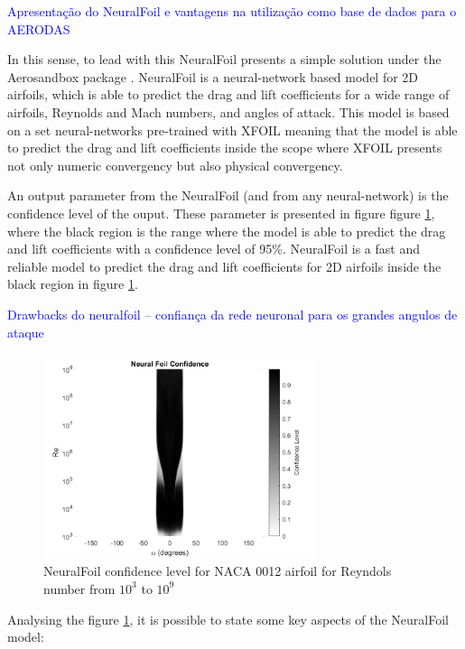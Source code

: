 \textcolor{blue}{Apresentação do NeuralFoil e vantagens na utilização como base de dados para o AERODAS} 

In this sense, to lead with this NeuralFoil \cite{sharpe_neuralfoil_nodate} presents a simple solution under the Aerosandbox package \cite{sharpe_aerosandbox_nodate,sharpe_accelerating_nodate}. NeuralFoil is a neural-network based model for 2D airfoils, which is able to predict the drag and lift coefficients for a wide range of airfoils, Reynolds and Mach numbers, and angles of attack. This model is based on a set neural-networks pre-trained with XFOIL meaning that the model is able to predict the drag and lift coefficients inside the scope where XFOIL presents not only numeric convergency but also physical convergency. 

An output parameter from the NeuralFoil (and from any neural-network) is the confidence level of the ouput. These parameter is presented in figure figure \ref{fig:neuralfoil_confidence}, where the black region is the range where the model is able to predict the drag and lift coefficients with a confidence level of 95\%. NeuralFoil \cite{sharpe_neuralfoil_nodate} is a fast and reliable model to predict the drag and lift coefficients for 2D airfoils inside the black region in figure \ref{fig:neuralfoil_confidence}.

\textcolor{blue}{Drawbacks do neuralfoil – confiança da rede neuronal para os grandes angulos de ataque}\\

\begin{figure}[!htb]
    \centering
    \includegraphics[width=8cm]{Figures/background/aero/NeuralFoil_Confidence_2D_black.png}
    \caption{NeuralFoil confidence level for NACA 0012 airfoil for Reyndols number from $10^3$ to $10^9$}
    \label{fig:neuralfoil_confidence}
\end{figure}

Analysing the figure \ref{fig:neuralfoil_confidence}, it is possible to state some key aspects of the NeuralFoil model:

